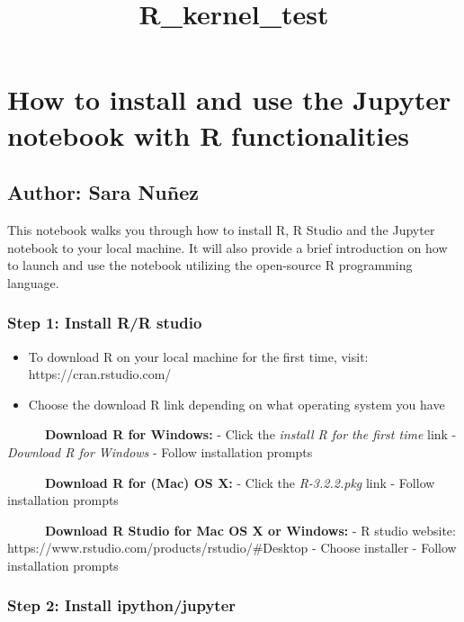 \documentclass{article}
\title{R\_kernel\_test}
\providecommand{\tightlist}{%
      \setlength{\itemsep}{0pt}\setlength{\parskip}{0pt}}
\begin{document}
    
    
    \maketitle
    
    

    
    \section{How to install and use the Jupyter notebook with R
functionalities}\label{how-to-install-and-use-the-jupyter-notebook-with-r-functionalities}

\subsection{Author: Sara Nuñez}\label{author-sara-nuuxf1ez}

    This notebook walks you through how to install R, R Studio and the
Jupyter notebook to your local machine. It will also provide a brief
introduction on how to launch and use the notebook utilizing the
open-source R programming language.

    \subsubsection{Step 1: Install R/R
studio}\label{step-1-install-rr-studio}

    \begin{itemize}
\tightlist
\item
  To download R on your local machine for the first time, visit:
  https://cran.rstudio.com/
\item
  Choose the download R link depending on what operating system you have
\end{itemize}

    ~~~~~~\textbf{Download R for Windows:} - Click the \emph{install R for
the first time} link - \emph{Download R for Windows} - Follow
installation prompts

~~~~~~\textbf{Download R for (Mac) OS X:} - Click the \emph{R-3.2.2.pkg}
link - Follow installation prompts

~~~~~~\textbf{Download R Studio for Mac OS X or Windows:} - R studio
website: https://www.rstudio.com/products/rstudio/\#Desktop - Choose
installer - Follow installation prompts

    \subsubsection{Step 2: Install
ipython/jupyter}\label{step-2-install-ipythonjupyter}
\end{document}
